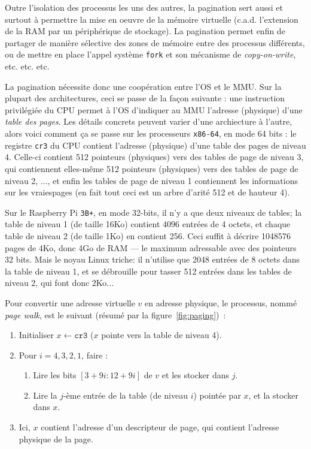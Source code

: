 Outre l'isolation des processus les uns des autres, la pagination sert aussi et
surtout à permettre la mise en oeuvre de la \og mémoire virtuelle\fg
(c.a.d. l'extension de la RAM par un périphérique de stockage). La pagination
permet enfin de partager de manière sélective des zones de mémoire entre des
processus différents, ou de mettre en place l'appel système \texttt{fork} et son
mécanisme de \og \emph{copy-on-write}\fg, etc. etc. etc.

La pagination nécessite donc une coopération entre l'OS et le MMU. Sur la
plupart des architectures, ceci se passe de la façon suivante : une instruction
privilégiée du CPU permet à l'OS d'indiquer au MMU l'adresse (physique) d'une
\emph{table des pages}. Les détails concrets peuvent varier d'une archiecture à
l'autre, alors voici comment ça se passe sur les processeurs \texttt{x86-64}, en
mode 64 bits : le registre \texttt{cr3} du CPU contient l'adresse (physique)
d'une table des pages de niveau 4. Celle-ci contient 512 pointeurs (physiques)
vers des tables de page de niveau 3, qui contiennent elles-même 512 pointeurs
(physiques) vers des tables de page de niveau 2, ..., et enfin les tables de
page de niveau 1 contiennent les informations sur les \og vraies\fg pages (en
fait tout ceci est un arbre d'arité 512 et de hauteur 4).

{\footnotesize Sur le Raspberry Pi \texttt{3B+}, en mode 32-bits, il n'y a que
  deux niveaux de tables; la table de niveau 1 (de taille 16Ko) contient 4096
  entrées de 4 octets, et chaque table de niveau 2 (de taille 1Ko) en contient
  256. Ceci suffit à décrire 1048576 pages de 4Ko, donc 4Go de RAM --- le
  maximum adressable avec des pointeurs 32 bits. Mais le noyau Linux \og
  triche\fg : il n'utilise que 2048 entrées de 8 octets dans la table de niveau
  1, et se débrouille pour tasser 512 entrées dans les tables de niveau 2, qui
  font donc 2Ko...}


Pour convertir une adresse virtuelle $v$ en adresse physique, le processus,
nommé \og \emph{page walk}, est le suivant (résumé par la figure~\ref{fig:paging})~:
\begin{enumerate}
\item Initialiser $x \gets \texttt{cr3}$ ($x$ pointe vers la table de niveau 4).
  \item Pour $i = 4, 3, 2, 1$, faire :
  \begin{enumerate}
  \item Lire les bits $[3+9i:12+9i]$ de $v$ et les stocker dans $j$.
  \item Lire la $j$-ème entrée de la table (de niveau $i$) pointée par $x$, et la stocker dans $x$.
  \end{enumerate}
\item Ici, $x$ contient l'adresse d'un descripteur de page, qui contient
  l'adresse physique de la page.
\end{enumerate}


